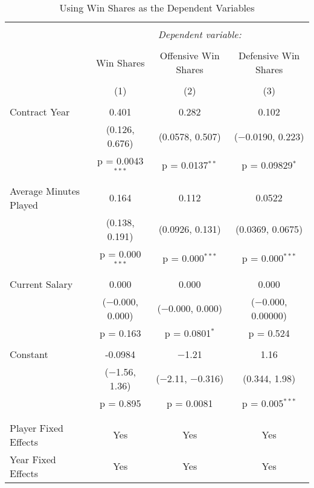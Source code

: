 \documentclass[12pt]{article}
\begin{document}
	
	\begin{landscape}
	\begin{table}[!htbp] \centering 
		\caption{Using Win Shares as the Dependent Variables} 
		\label{geewinshare} 
		\begin{tabular}{@{\extracolsep{5pt}}lccc} 
			\\[-1.8ex]\hline 
			\hline \\[-1.8ex] 
			& \multicolumn{3}{c}{\textit{Dependent variable:}} \\ 
			\cline{2-4} 
			\\[-1.8ex] & Win Shares & Offensive Win Shares & Defensive Win Shares \\ 
			\\[-1.8ex] & (1) & (2) & (3)\\ 
			\hline \\[-1.8ex] 
			Contract Year & 0.401 & 0.282 & 0.102 \\ 
			& (0.126, 0.676) & (0.0578, 0.507) & ($-$0.0190, 0.223) \\ 
			& p = 0.0043$^{***}$ & p = 0.0137$^{**}$ & p = 0.09829$^{*}$ \\ 
			& & & \\ 
			Average Minutes Played & 0.164 & 0.112 & 0.0522 \\ 
			& (0.138, 0.191) & (0.0926, 0.131) & (0.0369, 0.0675) \\ 
			& p = 0.000$^{***}$ & p = 0.000$^{***}$ & p = 0.000$^{***}$ \\ 
			& & & \\ 
			Current Salary & 0.000 & 0.000 & 0.000 \\ 
			& ($-$0.000, 0.000) & ($-$0.000, 0.000) & ($-$0.000, 0.00000) \\ 
			& p = 0.163 & p = 0.0801$^{*}$ & p = 0.524 \\ 
			& & & \\ 
			Constant & -0.0984 & $-$1.21 & 1.16 \\ 
			& ($-$1.56, 1.36) & ($-$2.11, $-$0.316) & (0.344, 1.98) \\ 
			& p = 0.895 & p = 0.0081 & p = 0.005$^{***}$ \\ 
			& & & \\ 
			\hline \\[-1.8ex] 
			Player Fixed Effects & Yes & Yes & Yes \\ 
			Year Fixed Effects & Yes & Yes & Yes \\ 

\end{tabular}
\end{table}
\end{landscape}
\end{document}
